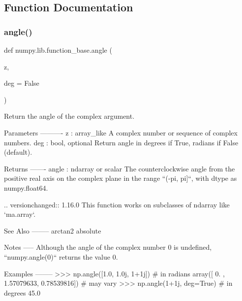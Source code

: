 \subsection{Function Documentation}
\mbox{\label{namespacenumpy_1_1lib_1_1function__base_affa486089c1232add7523d4077b28652}} 
\subsubsection{\texorpdfstring{angle()}{angle()}}
{\footnotesize\ttfamily def numpy.\+lib.\+function\+\_\+base.\+angle (\begin{DoxyParamCaption}\item[{}]{z,  }\item[{}]{deg = {\ttfamily False} }\end{DoxyParamCaption})}

\begin{DoxyVerb}Return the angle of the complex argument.

Parameters
----------
z : array_like
    A complex number or sequence of complex numbers.
deg : bool, optional
    Return angle in degrees if True, radians if False (default).

Returns
-------
angle : ndarray or scalar
    The counterclockwise angle from the positive real axis on the complex
    plane in the range ``(-pi, pi]``, with dtype as numpy.float64.

    .. versionchanged:: 1.16.0
        This function works on subclasses of ndarray like `ma.array`.

See Also
--------
arctan2
absolute

Notes
-----
Although the angle of the complex number 0 is undefined, ``numpy.angle(0)``
returns the value 0.

Examples
--------
>>> np.angle([1.0, 1.0j, 1+1j])               # in radians
array([ 0.        ,  1.57079633,  0.78539816]) # may vary
>>> np.angle(1+1j, deg=True)                  # in degrees
45.0\end{DoxyVerb}
 \mbox{\label{namespacenumpy_1_1lib_1_1function__base_a3d2c28a02f8e243ec2d9ed603c93333f}} 
